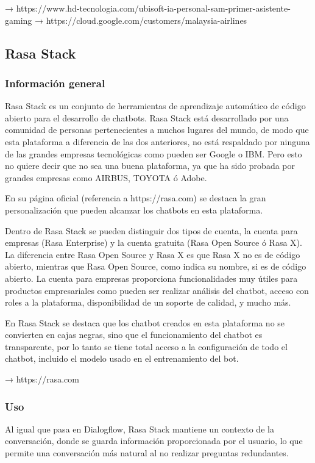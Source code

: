 → https://www.hd-tecnologia.com/ubisoft-ia-personal-sam-primer-asistente-gaming
→ https://cloud.google.com/customers/malaysia-airlines


\subsection{Rasa Stack}

\subsubsection*{Información general}

Rasa Stack es un conjunto de herramientas de aprendizaje automático de código abierto para el desarrollo de chatbots. Rasa Stack está desarrollado por una comunidad de personas pertenecientes a muchos lugares del mundo, de modo que esta plataforma a diferencia de las dos anteriores, no está respaldado por ninguna de las grandes empresas tecnológicas como pueden ser Google o IBM. Pero esto no quiere decir que no sea una buena plataforma, ya que ha sido probada por grandes empresas como AIRBUS, TOYOTA ó Adobe.

En su página oficial (referencia a https://rasa.com) se destaca la gran personalización que pueden alcanzar los chatbots en esta plataforma.

Dentro de Rasa Stack se pueden distinguir dos tipos de cuenta, la cuenta para empresas (Rasa Enterprise) y la cuenta gratuita (Rasa Open Source ó Rasa X). La diferencia entre Rasa Open Source y Rasa X es que Rasa X no es de código abierto, mientras que Rasa Open Source, como indica su nombre, si es de código abierto. La cuenta para empresas proporciona funcionalidades muy útiles para productos empresariales como pueden ser realizar análisis del chatbot, acceso con roles a la plataforma, disponibilidad de un soporte de calidad, y mucho más.

En Rasa Stack se destaca que los chatbot creados en esta plataforma no se convierten en cajas negras, sino que el funcionamiento del chatbot es transparente, por lo tanto se tiene total acceso a la configuración de todo el chatbot, incluido el modelo usado en el entrenamiento del bot.


→ https://rasa.com

\subsubsection*{Uso}

Al igual que pasa en Dialogflow, Rasa Stack mantiene un contexto de la conversación, donde se guarda información proporcionada por el usuario, lo que permite una conversación más natural al no realizar preguntas redundantes.

